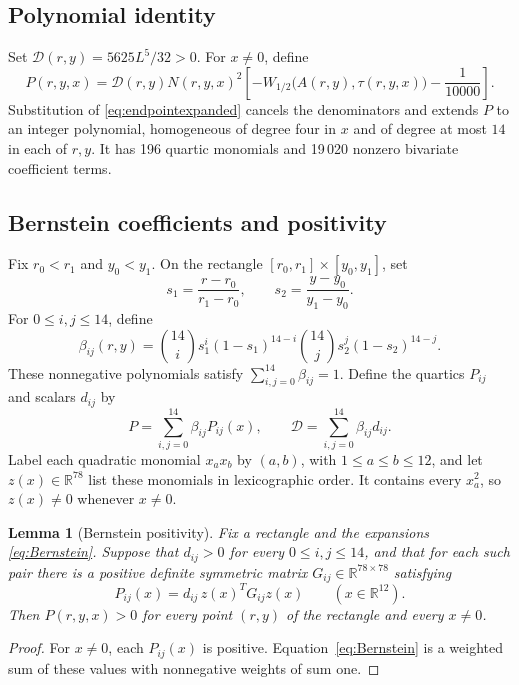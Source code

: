 \documentclass[11pt,a4paper]{amsart}
\numberwithin{equation}{section}
\newtheorem{lemma}[theorem]{Lemma}
\theoremstyle{definition}
\theoremstyle{remark}
\newcommand{\R}{\mathbb R}
\begin{document}
\subsection*{Polynomial identity}
Set $\mathscr D(r,y)=5625L^5/32>0$. For $x\ne0$, define
\begin{equation}\label{eq:Pidentity}
 P(r,y,x)=\mathscr D(r,y)N(r,y,x)^2
 \left[-W_{1/2}\bigl(A(r,y),\tau(r,y,x)\bigr)-\frac1{10000}\right].
\end{equation}
Substitution of \eqref{eq:endpointexpanded} cancels the denominators
and extends $P$ to an integer polynomial, homogeneous of degree four
in $x$ and of degree at most $14$ in each of $r,y$. It has 196 quartic
monomials and 19\,020 nonzero bivariate coefficient terms.

\subsection*{Bernstein coefficients and positivity}
Fix $r_0<r_1$ and $y_0<y_1$. On the rectangle
$[r_0,r_1]\times[y_0,y_1]$, set
\[
 s_1=\frac{r-r_0}{r_1-r_0},\qquad
 s_2=\frac{y-y_0}{y_1-y_0}.
\]
For $0\le i,j\le14$, define
\begin{equation}\label{eq:Bernsteinbasis}
 \beta_{ij}(r,y)=\binom{14}{i}s_1^i(1-s_1)^{14-i}
                 \binom{14}{j}s_2^j(1-s_2)^{14-j}.
\end{equation}
These nonnegative polynomials satisfy $\sum_{i,j=0}^{14}\beta_{ij}=1$.
Define the quartics $P_{ij}$ and scalars $d_{ij}$ by
\begin{equation}\label{eq:Bernstein}
 P=\sum_{i,j=0}^{14}\beta_{ij}P_{ij}(x),\qquad
 \mathscr D=\sum_{i,j=0}^{14}\beta_{ij}d_{ij}.
\end{equation}
Label each quadratic monomial $x_ax_b$ by $(a,b)$, with
$1\le a\le b\le12$, and let $z(x)\in\R^{78}$ list these monomials
in lexicographic order. It contains every $x_a^2$, so $z(x)\ne0$
whenever $x\ne0$.

\begin{lemma}[Bernstein positivity]\label{lem:certificate}
Fix a rectangle and the expansions \eqref{eq:Bernstein}.
Suppose that $d_{ij}>0$ for every $0\le i,j\le14$, and that for
each such pair there is a positive definite symmetric matrix
$G_{ij}\in\R^{78\times78}$ satisfying
\[
 P_{ij}(x)=d_{ij}\,z(x)^TG_{ij}z(x)\qquad(x\in\R^{12}).
\]
Then $P(r,y,x)>0$ for every point $(r,y)$ of the rectangle and
every $x\ne0$.
\end{lemma}
\begin{proof}
For $x\ne0$, each $P_{ij}(x)$ is positive. Equation~\eqref{eq:Bernstein}
is a weighted sum of these values with nonnegative weights of sum one.
\end{proof}
\end{document}
